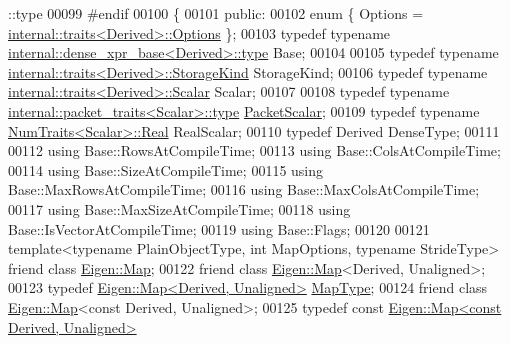 \begin{DoxyCode}
      ::type
00099 \textcolor{preprocessor}{#endif}
00100 \{
00101   \textcolor{keyword}{public}:
00102     \textcolor{keyword}{enum} \{ Options = \hyperlink{struct_eigen_1_1internal_1_1traits}{internal::traits<Derived>::Options} \};
00103     \textcolor{keyword}{typedef} \textcolor{keyword}{typename} \hyperlink{struct_eigen_1_1internal_1_1dense__xpr__base}{internal::dense\_xpr\_base<Derived>::type} Base;
00104 
00105     \textcolor{keyword}{typedef} \textcolor{keyword}{typename} \hyperlink{struct_eigen_1_1internal_1_1traits}{internal::traits<Derived>::StorageKind} 
      StorageKind;
00106     \textcolor{keyword}{typedef} \textcolor{keyword}{typename} \hyperlink{struct_eigen_1_1internal_1_1traits}{internal::traits<Derived>::Scalar} Scalar;
00107     
00108     \textcolor{keyword}{typedef} \textcolor{keyword}{typename} \hyperlink{group___sparse_core___module}{internal::packet\_traits<Scalar>::type} 
      \hyperlink{group___sparse_core___module}{PacketScalar};
00109     \textcolor{keyword}{typedef} \textcolor{keyword}{typename} \hyperlink{group___core___module_struct_eigen_1_1_num_traits}{NumTraits<Scalar>::Real} RealScalar;
00110     \textcolor{keyword}{typedef} Derived DenseType;
00111 
00112     \textcolor{keyword}{using} Base::RowsAtCompileTime;
00113     \textcolor{keyword}{using} Base::ColsAtCompileTime;
00114     \textcolor{keyword}{using} Base::SizeAtCompileTime;
00115     \textcolor{keyword}{using} Base::MaxRowsAtCompileTime;
00116     \textcolor{keyword}{using} Base::MaxColsAtCompileTime;
00117     \textcolor{keyword}{using} Base::MaxSizeAtCompileTime;
00118     \textcolor{keyword}{using} Base::IsVectorAtCompileTime;
00119     \textcolor{keyword}{using} Base::Flags;
00120 
00121     \textcolor{keyword}{template}<\textcolor{keyword}{typename} PlainObjectType, \textcolor{keywordtype}{int} MapOptions, \textcolor{keyword}{typename} Str\textcolor{keywordtype}{id}eType> \textcolor{keyword}{friend} \textcolor{keyword}{class }
      \hyperlink{group___core___module_class_eigen_1_1_map}{Eigen::Map};
00122     \textcolor{keyword}{friend}  \textcolor{keyword}{class }\hyperlink{group___core___module_class_eigen_1_1_map}{Eigen::Map}<Derived, Unaligned>;
00123     \textcolor{keyword}{typedef} \hyperlink{group___core___module_class_eigen_1_1_map}{Eigen::Map<Derived, Unaligned>}  
      \hyperlink{group___core___module_class_eigen_1_1_map}{MapType};
00124     \textcolor{keyword}{friend}  \textcolor{keyword}{class }\hyperlink{group___core___module_class_eigen_1_1_map}{Eigen::Map}<const Derived, Unaligned>;
00125     \textcolor{keyword}{typedef} \textcolor{keyword}{const} \hyperlink{group___core___module_class_eigen_1_1_map}{Eigen::Map<const Derived, Unaligned>} 

\end{DoxyCode}
